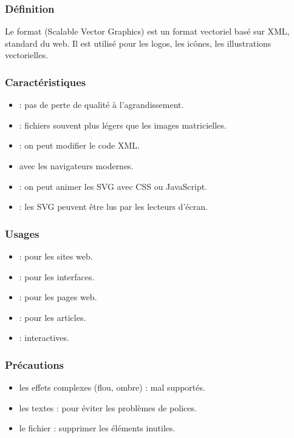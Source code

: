 \subsubsection{Définition}

Le format  (Scalable Vector Graphics) est un format vectoriel basé sur XML, standard du web. Il est utilisé pour les logos, les icônes, les illustrations vectorielles.

\subsubsection{Caractéristiques}

\begin{itemize}
    \item {} : pas de perte de qualité à l'agrandissement.
    \item {} : fichiers souvent plus légers que les images matricielles.
    \item {} : on peut modifier le code XML.
    \item {} avec les navigateurs modernes.
    \item {} : on peut animer les SVG avec CSS ou JavaScript.
    \item {} : les SVG peuvent être lus par les lecteurs d'écran.
\end{itemize}

\subsubsection{Usages}

\begin{itemize}
    \item {} : pour les sites web.
    \item {} : pour les interfaces.
    \item {} : pour les pages web.
    \item {} : pour les articles.
    \item {} : interactives.
\end{itemize}

\subsubsection{Précautions}

\begin{itemize}
    \item {} les effets complexes (flou, ombre) : mal supportés.
    \item {} les textes : pour éviter les problèmes de polices.
    \item {} le fichier : supprimer les éléments inutiles.
\end{itemize}

